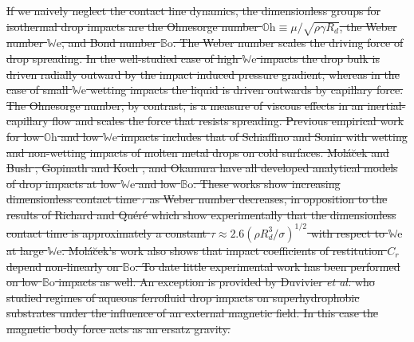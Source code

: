 \documentclass[aip,reprint, floatfix]{revtex4-1}
\begin{document}
\sout{If we naively neglect the contact line dynamics, the dimensionless groups for isothermal drop impacts are the Ohnesorge number $\mathbb{O}\mbox{h} \equiv \mu/\sqrt{\rho \gamma R_d}$, the Weber number $\mathbb{W}\mbox{e}$, and Bond number $\mathbb{B}\mbox{o}$. The Weber number scales the driving force of drop spreading. In the well-studied case of high $\mathbb{W}\mbox{e}$ impacts the drop bulk is driven radially outward by the impact induced pressure gradient, whereas in the case of small $\mathbb{W}\mbox{e}$ wetting impacts the liquid is driven outwards by capillary force. The Ohnesorge number, by contrast, is a measure of viscous effects in an inertial-capillary flow and scales the force that resists spreading. Previous empirical work for low $\mathbb{O}\mbox{h}$ and low $\mathbb{W}\mbox{e}$ impacts includes that of Schiaffino and Sonin \cite{schiaffino_molten_1997} with wetting and non-wetting impacts of molten metal drops on cold surfaces. Mol\'{a}\u{c}ek and Bush \cite{molacek_quasi-static_2012}, Gopinath and Koch \cite{gopinath_collision_2002}, and Okamura \cite{okumura_water_2003} have all developed analytical models of drop impacts at low $\mathbb{W}\mbox{e}$ and low $\mathbb{B}\mbox{o}$. These works show increasing dimensionless contact time $\tau$ as Weber number decreases, in opposition to the results of Richard and Qu\'{e}r\'{e} \cite{richard_surface_2002} which show experimentally that the dimensionless contact time is approximately a constant $\tau \approx 2.6(\rho R^3_d/\sigma)^{1/2}$ with respect to $\mathbb{W}\mbox{e}$ at large $\mathbb{W}\mbox{e}$. Mol\'{a}\u{c}ek's work also shows that impact coefficients of restitution $C_r$ depend non-linearly on $\mathbb{B}\mbox{o}$. To date little experimental work has been performed on low $\mathbb{B}\mbox{o}$ impacts as well. An exception is provided by Duvivier \emph{et al.} \cite{duvivier_drop_2012} who studied regimes of aqueous ferrofluid drop impacts on superhydrophobic substrates under the influence of an external magnetic field. In this case the magnetic body force acts as an ersatz gravity.}
\end{document}
